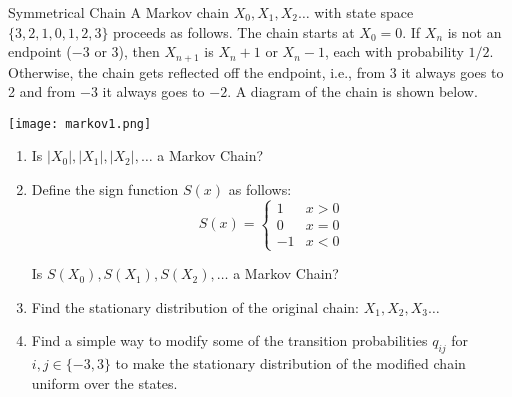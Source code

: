 \documentclass[11.5pt]{article}
\begin{document}
\begin{exercise}{Symmetrical Chain} 
A Markov chain $X_0,X_1, X_2\ldots$ with state space $\{3,2,1,0,1,2, 3\}$ proceeds as follows. The chain starts at $X_0 = 0$. If $X_n$ is not an endpoint ($-3$ or $3$), then $X_{n+1}$ is
$X_n +1$ or $X_n -1$, each with probability $1/2$. Otherwise, the chain gets reflected off the endpoint, i.e., from 3 it always goes to 2 and from $-3$ it always goes to $-2$. A diagram
of the chain is shown below.\begin{center}
\texttt{[image: markov1.png]}
\end{center}
\begin{enumerate}
\item Is $|X_0|, |X_1|, |X_2|, \ldots$ a Markov Chain? 

\item Define the sign function $S(x)$ as follows: 
\[ S(x) = \begin{cases} 
      1 & x > 0 \\
      0 & x = 0 \\
      -1 & x < 0
   \end{cases}
\]

Is $S(X_0), S(X_1), S(X_2), \ldots$ a Markov Chain? 

\item Find the stationary distribution of the original chain: $X_1, X_2, X_3 \ldots$

\item Find a simple way to modify some of the transition probabilities $q_{ij}$ for $i,j \in \{-3, 3\}$ to make the stationary distribution of the modified chain uniform over the states.
\end{enumerate}

\end{exercise}
\end{document}
